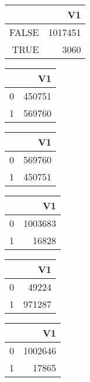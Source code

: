 \bigskip\bigskip
\centering
\begin{tabular}{rr}
  \hline
 & V1 \\ 
  \hline
FALSE & 1017451 \\ 
  TRUE & 3060 \\ 
   \hline
\end{tabular}

\bigskip\bigskip
\centering
\begin{tabular}{rr}
  \hline
 & V1 \\ 
  \hline
0 & 450751 \\ 
  1 & 569760 \\ 
   \hline
\end{tabular}

\bigskip\bigskip
\centering
\begin{tabular}{rr}
  \hline
 & V1 \\ 
  \hline
0 & 569760 \\ 
  1 & 450751 \\ 
   \hline
\end{tabular}

\bigskip\bigskip
\centering
\begin{tabular}{rr}
  \hline
 & V1 \\ 
  \hline
0 & 1003683 \\ 
  1 & 16828 \\ 
   \hline
\end{tabular}

\bigskip\bigskip
\centering
\begin{tabular}{rr}
  \hline
 & V1 \\ 
  \hline
0 & 49224 \\ 
  1 & 971287 \\ 
   \hline
\end{tabular}

\bigskip\bigskip
\centering
\begin{tabular}{rr}
  \hline
 & V1 \\ 
  \hline
0 & 1002646 \\ 
  1 & 17865 \\ 
   \hline
\end{tabular}

